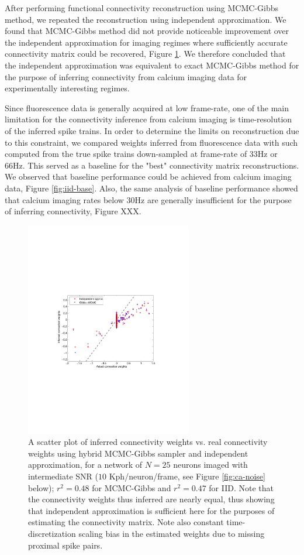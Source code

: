 \documentclass[amsmath,amssymb]{revtex4}
\begin{document}
After performing functional connectivity reconstruction using MCMC-Gibbs method, we repeated the reconstruction using independent approximation. We found that MCMC-Gibbs method did not provide noticeable improvement over the independent approximation for imaging regimes where sufficiently accurate connectivity matrix could be recovered, Figure \ref{fig:mcmc-iid}. We therefore concluded that the independent approximation was equivalent to exact MCMC-Gibbs method for the purpose of inferring connectivity from calcium imaging data for experimentally interesting regimes.

Since fluorescence data is generally acquired at low frame-rate, one of the main limitation for the connectivity inference from calcium imaging is time-resolution of the inferred spike trains. In order to determine the limits on reconstruction due to this constraint, we compared weights inferred from fluorescence data with such computed from the true spike trains down-sampled at frame-rate of 33Hz or 66Hz. This served as a baseline for the "best" connectivity matrix reconstructions. We observed that baseline performance could be achieved from calcium imaging data, Figure \ref{fig:iid-base}.
Also, the same analysis of baseline performance showed that calcium imaging rates below 30Hz are generally insufficient for the purpose of inferring connectivity, Figure XXX.
\begin{figure}
\includegraphics[width=275px]{Figure1_fluor_mcmc_vs_iid}
\caption{A scatter plot of inferred connectivity weights vs. real connectivity weights
using hybrid MCMC-Gibbs sampler and independent approximation, for a network of $N=25$ neurons imaged
with intermediate SNR ($10$ Kph/neuron/frame, see Figure \ref{fig:ca-noise} below); $r^2=0.48$ for MCMC-Gibbs and
$r^2=0.47$ for IID. Note that the connectivity weights thus inferred are nearly equal, thus showing that independent approximation is sufficient here for the purposes of estimating the connectivity matrix. Note also constant time-discretization scaling bias in the estimated weights due to missing proximal spike pairs.}
\label{fig:mcmc-iid}
\end{figure}
\end{document}

